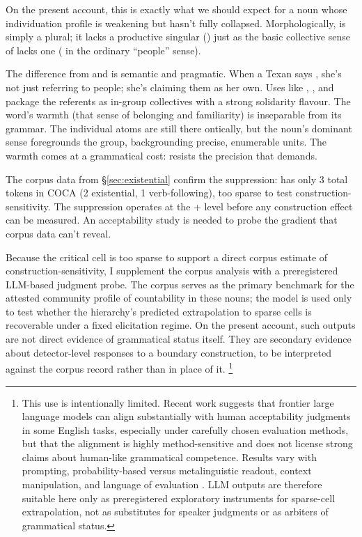 \documentclass[12pt,a4paper]{article}
\begin{document}
On the present account, this is exactly what we should expect for a noun whose individuation profile is weakening but hasn't fully collapsed. Morphologically,  is simply a plural; it lacks a productive singular () just as the basic collective sense of  lacks one ( in the ordinary \enquote{people} sense).

The difference from  and  is semantic and pragmatic. When a Texan says , she's not just referring to people; she's claiming them as her own. Uses like , , and  package the referents as in-group collectives with a strong solidarity flavour. The word's warmth (that sense of belonging and familiarity) is inseparable from its grammar. The individual atoms are still there ontically, but the noun's dominant sense foregrounds the group, backgrounding precise, enumerable units. The warmth comes at a grammatical cost:  resists the precision that  demands.

The corpus data from \S\ref{sec:existential} confirm the suppression:  has only 3 total tokens in COCA (2 existential, 1 verb-following), too sparse to test construction-sensitivity. The suppression operates at the  +  level before any construction effect can be measured. An acceptability study is needed to probe the gradient that corpus data can't reveal.

Because the critical  cell is too sparse to support a direct corpus estimate of construction-sensitivity, I supplement the corpus analysis with a preregistered LLM-based judgment probe. The corpus serves as the primary benchmark for the attested community profile of countability in these nouns; the model is used only to test whether the hierarchy's predicted extrapolation to sparse cells is recoverable under a fixed elicitation regime. On the present account, such outputs are not direct evidence of grammatical status itself. They are secondary evidence about detector-level responses to a boundary construction, to be interpreted against the corpus record rather than in place of it.%
\footnote{This use is intentionally limited. Recent work suggests that frontier large language models can align substantially with human acceptability judgments in some English tasks, especially under carefully chosen evaluation methods, but that the alignment is highly method-sensitive and does not license strong claims about human-like grammatical competence. Results vary with prompting, probability-based versus metalinguistic readout, context manipulation, and language of evaluation \citep{qiu2024,qiu2025,hu2024,hu-levy2023,sinha2023,dentella2023,leivada2024reply,juzek2024}. LLM outputs are therefore suitable here only as preregistered exploratory instruments for sparse-cell extrapolation, not as substitutes for speaker judgments or as arbiters of grammatical status.}
\end{document}
